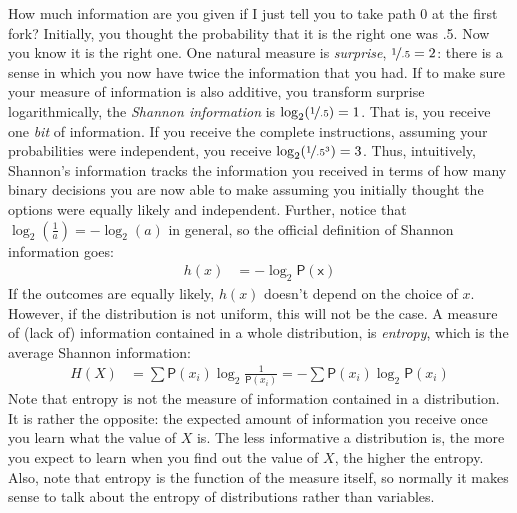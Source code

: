\documentclass[
  10pt,
  dvipsnames,enabledeprecatedfontcommands]{scrartcl}
\newcommand{\pr}[1]{\mathsf{P}(#1)}
\begin{document}
How much information are you given if I just tell you to take path 0 at
the first fork? Initially, you thought the probability that it is the
right one was .5. Now you know it is the right one. One natural measure
is \emph{surprise}, \(\nicefrac{1}{.5}=2\): there is a sense in which
you now have twice the information that you had. If to make sure your
measure of information is also additive, you transform surprise
logarithmically, the \emph{Shannon information} is
\(\log_2(\nicefrac{1}{.5})=1\). That is, you receive one \emph{bit} of
information. If you receive the complete instructions, assuming your
probabilities were independent, you receive
\(\log_2(\nicefrac{1}{.5^3})=3\). Thus, intuitively, Shannon's
information tracks the information you received in terms of how many
binary decisions you are now able to make assuming you initially thought
the options were equally likely and independent. Further, notice that
\(\log_2(\frac{1}{a})= - \log_2(a)\) in general, so the official
definition of Shannon information goes: \begin{align*}
h(x) & = - \log_2 \mathsf{\pr{x}}
\end{align*} If the outcomes are equally likely, \(h(x)\) doesn't depend
on the choice of \(x\). However, if the distribution is not uniform,
this will not be the case. A measure of (lack of) information contained
in a whole distribution, is \emph{entropy}, which is the average Shannon
information: \begin{align*}
H(X)  & = \sum \mathsf{P}(x_i) \log_2 \frac{1}{\mathsf{P}(x_i)} =
- \sum \mathsf{P}(x_i) \log_2 \mathsf{P}(x_i)
\end{align*} \noindent Note that entropy is not the measure of
information contained in a distribution. It is rather the opposite: the
expected amount of information you receive once you learn what the value
of \(X\) is. The less informative a distribution is, the more you expect
to learn when you find out the value of \(X\), the higher the entropy.
Also, note that entropy is the function of the measure itself, so
normally it makes sense to talk about the entropy of distributions
rather than variables.
\end{document}
